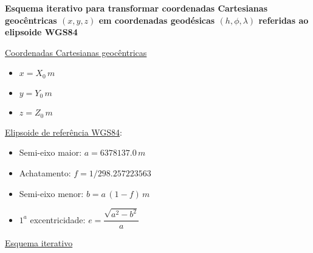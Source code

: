 \documentclass[10pt,a4paper]{article}
\author{Vanderlei C. Oliveira Jr.}
\begin{document}
\begin{center}
\begin{large}
\textbf{Esquema iterativo para transformar coordenadas Cartesianas 
geocêntricas $(x,y,z)$ em coordenadas geodésicas $(h,\phi,\lambda)$
referidas ao elipsoide WGS84}
\end{large}
\end{center}

\bigskip
\bigskip

\underline{Coordenadas Cartesianas geocêntricas}

\begin{itemize}
\item $x = X_{0} \, m$ 
\item $y = Y_{0} \, m$
\item $z = Z_{0} \, m$
\end{itemize}

\bigskip

\underline{Elipsoide de refer\^{e}ncia WGS84}:

\begin{itemize}
\item Semi-eixo maior: $a = 6378137.0 \, m$
\item Achatamento: $f = 1/298.257223563$
\item Semi-eixo menor: $b = a \, (1 - f) \, m$
\item $1^{a}$ excentricidade: $e = \dfrac{\sqrt{a^{2} - b^{2}}}{a}$
\end{itemize}

\bigskip

\underline{Esquema iterativo}
\end{document}
